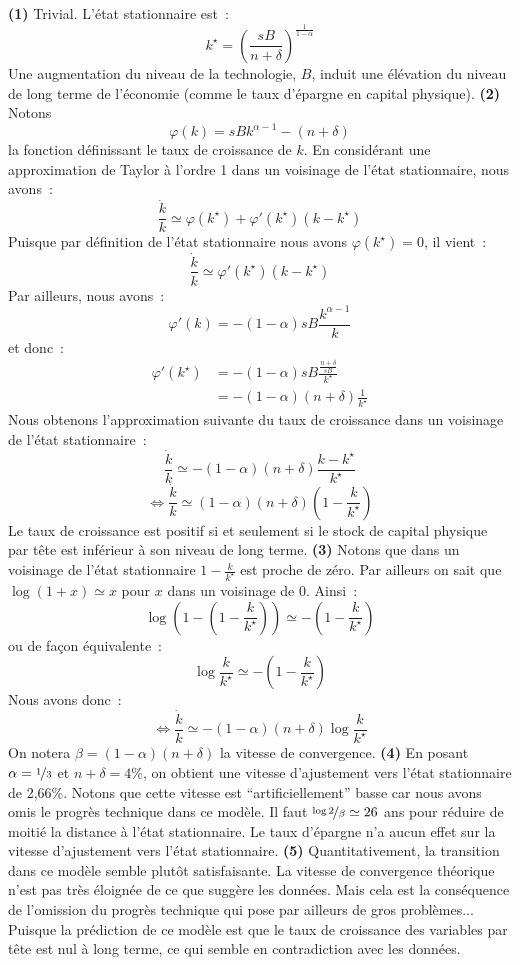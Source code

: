 \documentclass[10pt,a4paper,notitlepage,onecolumn]{article}
\newcommand{\question}[1]{\textbf{(#1)}}
\newcommand{\growth}[1]{\frac{\dot{#1}}{#1}}
\begin{document}
\question{1} Trivial. L'état stationnaire est :
\[
k^{\star} = \left(\frac{sB}{n+\delta}\right)^{\frac{1}{1-\alpha}}
\]
Une  augmentation  du  niveau  de  la  technologie,  $B$,  induit  une
élévation  du  niveau de  long  terme  de  l'économie (comme  le  taux
d'épargne en capital physique). \question{2} Notons
\[
\varphi(k) = sBk^{\alpha-1} - (n+\delta) 
\]
la fonction définissant  le taux de croissance de  $k$. En considérant
une approximation  de Taylor à l'ordre  1 dans un voisinage  de l'état
stationnaire, nous avons :
\[
\growth{k} \simeq \varphi (k^\star) + \varphi '(k^{\star}) \left(k-k^{\star}\right)
\]
Puisque par définition de l'état stationnaire nous avons $\varphi (k^\star)=0$, il vient :
\[
\growth{k} \simeq \varphi '(k^{\star}) \left(k-k^{\star}\right)
\]
Par ailleurs, nous avons :
\[
\varphi '(k) = -(1-\alpha)sB\frac{k^{\alpha-1}}{k}
\]
et donc :
\[
\begin{split}
  \varphi '(k^{\star}) &= -(1-\alpha)sB\frac{\frac{n+\delta}{sB}}{k^{\star}}\\
  &= -(1-\alpha)(n+\delta)\frac{1}{k^{\star}}
\end{split}
\]
Nous obtenons l'approximation  suivante du taux de  croissance dans un
voisinage de l'état stationnaire :
\[
\growth{k} \simeq -(1-\alpha)(n+\delta)\frac{k-k^{\star}}{k^{\star}}
\] 
\[
\Leftrightarrow \growth{k} \simeq (1-\alpha)(n+\delta)\left(1-\frac{k}{k^{\star}}\right)
\]
Le  taux de  croissance est  positif si  et seulement  si le  stock de
capital physique  par tête est inférieur à son niveau de  long terme.
\question{3}  Notons  que dans  un  voisinage  de l'état  stationnaire
$1-\frac{k}{k^{\star}}$ est proche  de zéro. Par ailleurs  on sait que
$\log (1+x)\simeq x$ pour $x$ dans un voisinage de 0. Ainsi :
\[
\log \left(1-\left(1-\frac{k}{k^{\star}}\right)\right) \simeq -\left(1-\frac{k}{k^{\star}}\right) 
\]
ou de façon équivalente :
\[
\log \frac{k}{k^{\star}} \simeq -\left(1-\frac{k}{k^{\star}}\right) 
\]
Nous avons donc :
\[
\Leftrightarrow \growth{k} \simeq -(1-\alpha)(n+\delta)\log \frac{k}{k^{\star}}
\]
On notera  $\beta =  (1-\alpha)(n+\delta)$ la vitesse  de convergence.
\question{4} En posant  $\alpha=\nicefrac{1}{3}$ et $n+\delta=4\%$, on
obtient une  vitesse d'ajustement vers l'état  stationnaire de 2,66\%.
Notons que cette vitesse est ``artificiellement'' basse car nous avons
omis le  progrès technique  dans ce  modèle.  Il  faut $\nicefrac{\log
  2}{\beta}\simeq 26$ ans pour réduire  de moitié la distance à l'état
stationnaire.   Le  taux d'épargne  n'a  aucun  effet sur  la  vitesse
d'ajustement vers l'état  stationnaire. \question{5} Quantitativement,
la transition dans  ce modèle semble plutôt  satisfaisante. La vitesse
de convergence théorique n'est pas très éloignée de ce que suggère les
données.   Mais  cela est  la  conséquence  de l'omission  du  progrès
technique  qui pose  par  ailleurs de  gros  problèmes...  Puisque  la
prédiction de  ce modèle est que  le taux de croissance  des variables
par tête est nul à long terme, ce qui semble en contradiction avec les
données.
\end{document}
